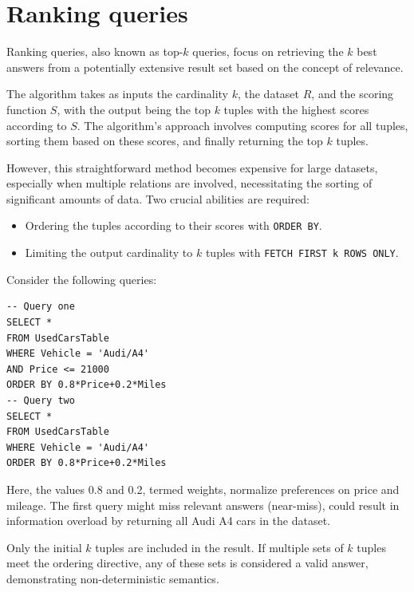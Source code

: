 \section{Ranking queries}

Ranking queries, also known as top-$k$ queries, focus on retrieving the $k$ best answers from a potentially extensive result set based on the concept of relevance.

The algorithm takes as inputs the cardinality $k$, the dataset $R$, and the scoring function $S$, with the output being the top $k$ tuples with the highest scores according to $S$.
The algorithm's approach involves computing scores for all tuples, sorting them based on these scores, and finally returning the top $k$ tuples.

However, this straightforward method becomes expensive for large datasets, especially when multiple relations are involved, necessitating the sorting of significant amounts of data.
Two crucial abilities are required: 
\begin{itemize}
    \item Ordering the tuples according to their scores with \texttt{ORDER BY}.
    \item Limiting the output cardinality to $k$ tuples with \texttt{FETCH FIRST k ROWS ONLY}.
\end{itemize} 
\begin{example}
    Consider the following queries: 
    \begin{lstlisting}[style=SQL]
-- Query one
SELECT *
FROM UsedCarsTable
WHERE Vehicle = 'Audi/A4'
AND Price <= 21000
ORDER BY 0.8*Price+0.2*Miles
-- Query two
SELECT *
FROM UsedCarsTable
WHERE Vehicle = 'Audi/A4'
ORDER BY 0.8*Price+0.2*Miles
    \end{lstlisting}
    Here, the values 0.8 and 0.2, termed weights, normalize preferences on price and mileage.
    The first query might miss relevant answers (near-miss), could result in information overload by returning all Audi A4 cars in the dataset.
\end{example}
Only the initial $k$ tuples are included in the result. 
If multiple sets of $k$ tuples meet the ordering directive, any of these sets is considered a valid answer, demonstrating non-deterministic semantics.

